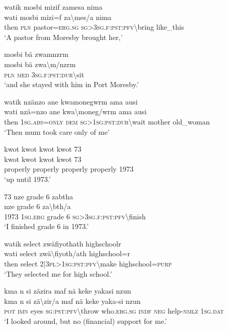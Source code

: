 \ea\label{ex:14:a3139}
watik mosbi mizif zamesa nima\\
\gll wati	mosbi	mizi=f	za{\textbackslash}mes/a	nima\\
     then	\textsc{pln}	pastor=\textsc{erg}.\textsc{sg}	\textsc{sg}>3\textsc{sg}.\textsc{f}:\textsc{pst}:\textsc{pfv}{\textbackslash}bring	like\_this\\
\glt `A pastor from Moresby brought her,'
\z

\ea\label{ex:14:a3140}
mosbi bä zwamnzrm\\
\gll mosbi	bä	zwa{\textbackslash}m/nzrm\\
     \textsc{pln}	\textsc{med}	3\textsc{sg}.\textsc{f}:\textsc{pst}:\textsc{dur}{\textbackslash}sit\\
\glt `and she stayed with him in Port Moresby.'
\z

\ea\label{ex:14:a11354}
watik nzänzo ane kwamonegwrm ama ausi\\
\gll wati	nzä=nzo	ane	kwa{\textbackslash}moneg/wrm	ama	ausi\\
     then	1\textsc{sg}.\textsc{abs}=\textsc{only}	\textsc{dem}	\textsc{sg}>1\textsc{sg}:\textsc{pst}:\textsc{dur}{\textbackslash}wait	mother	old\_woman\\
\glt `Then mum took care only of me'
\z

\ea\label{ex:14:a3141}
kwot kwot kwot kwot 73\\
\gll kwot	kwot	kwot	kwot	73\\
     properly	properly	properly	properly	1973\\
\glt `up until 1973.'
\z

\ea\label{ex:14:a3142}
73 nze grade 6 zabtha\\
	nze	grade	6	za{\textbackslash}bth/a\\
     1973	1\textsc{sg}.\textsc{erg}	grade	6	\textsc{sg}>3\textsc{sg}.\textsc{f}:\textsc{pst}:\textsc{pfv}{\textbackslash}finish\\
\glt `I finished grade 6 in 1973.'
\z

\ea\label{ex:14:a3143}
watik select zwäfiyothath highschoolr\\
\gll wati	select	zwä{\textbackslash}fiyoth/ath	highschool=r\\
     then	select	2|3\textsc{pl}>1\textsc{sg}:\textsc{pst}:\textsc{pfv}{\textbackslash}make	highschool=\textsc{purp}\\
\glt `They selected me for high school.'
\z

\ea\label{ex:14:a3145}
kma n si zäzira maf nä keke yakasi nzun\\
\gll kma	n	si	zä{\textbackslash}zir/a	maf	nä	keke	yaka-si	nzun\\
     \textsc{pot}	\textsc{imn}	eyes	\textsc{sg}:\textsc{pst}:\textsc{pfv}{\textbackslash}throw	who.\textsc{erg}.\textsc{sg}	\textsc{indf}	\textsc{neg}	help-\textsc{nmlz}	1\textsc{sg}.\textsc{dat}\\
\glt `I looked around, but no (financial) support for me.'
\z

